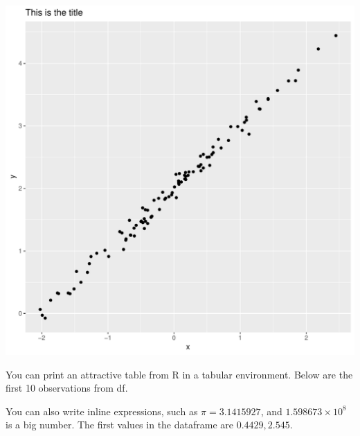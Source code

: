 \documentclass[letterpaper,12pt]{article}\usepackage[]{graphicx}\usepackage[]{color}
\makeatletter
\def\maxwidth{ %
  \ifdim\Gin@nat@width>\linewidth
    \linewidth
  \else
    \Gin@nat@width
  \fi
}
\newenvironment{knitrout}{}{} %
\makeatother
\begin{document}
\begin{knitrout}
\color{fgcolor}
\includegraphics[width=\maxwidth]{figure/plot_hidden-1} 

\end{knitrout}

You can print an attractive table from R in a tabular environment.
Below are the first 10 observations from df.


You can also write inline expressions,
  such as $\pi=3.1415927$, and \ensuremath{1.598673\times 10^{8}} is a big number.
The first values in the dataframe are $0.4429, 2.545$.
\end{document}
